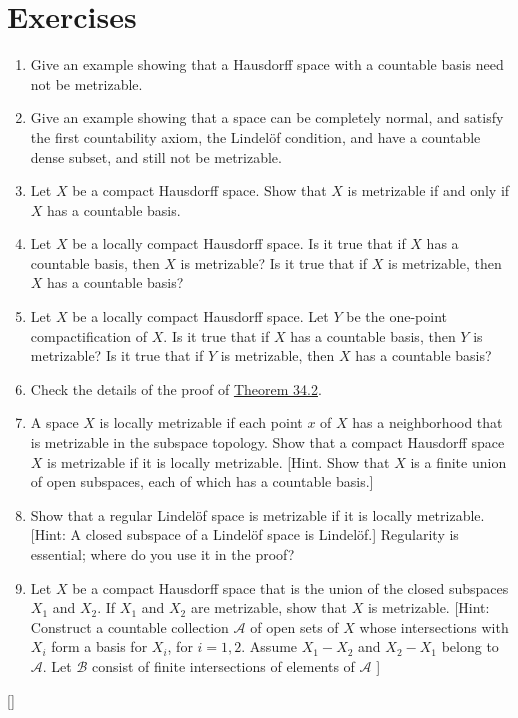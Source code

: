 \section*{Exercises}
\begin{enumerate}[itemsep=0.4em, parsep=0pt, topsep=0pt, partopsep=0pt, leftmargin=*, label=\arabic*., ref=\arabic*]
\item Give an example showing that a Hausdorff space with a countable basis need not be metrizable.
\item Give an example showing that a space can be completely normal, and satisfy the first countability axiom, the Lindelöf condition, and have a countable dense subset, and still not be metrizable.
\item Let \(X\) be a compact Hausdorff space. Show that \(X\) is metrizable if and only if \(X\) has a countable basis.
\item Let \(X\) be a locally compact Hausdorff space. Is it true that if \(X\) has a countable basis, then \(X\) is metrizable? Is it true that if \(X\) is metrizable, then \(X\) has a countable basis?
\item Let \(X\) be a locally compact Hausdorff space. Let \(Y\) be the one-point compactification of \(X\). Is it true that if \(X\) has a countable basis, then \(Y\) is metrizable? Is it true that if \(Y\) is metrizable, then \(X\) has a countable basis?
\item Check the details of the proof of \hyperref[thm:34.2]{Theorem 34.2}.
\item A space \(X\) is locally metrizable if each point \(x\) of \(X\) has a neighborhood that is metrizable in the subspace topology. Show that a compact Hausdorff space \(X\) is metrizable if it is locally metrizable. [Hint. Show that \(X\) is a finite union of open subspaces, each of which has a countable basis.]
\item Show that a regular Lindelöf space is metrizable if it is locally metrizable. [Hint: A closed subspace of a Lindelöf space is Lindelöf.] Regularity is essential; where do you use it in the proof?
\item Let \(X\) be a compact Hausdorff space that is the union of the closed subspaces \(X_{1}\) and \(X_{2}\). If \(X_{1}\) and \(X_{2}\) are metrizable, show that \(X\) is metrizable. [Hint: Construct a countable collection \(\mathcal{A}\) of open sets of \(X\) whose intersections with \(X_{i}\) form a basis for \(X_{i}\), for \(i = 1,2\). Assume \(X_{1} - X_{2}\) and \(X_{2} - X_{1}\) belong to \(\mathcal{A}\). Let \(\mathcal{B}\) consist of finite intersections of elements of \(\mathcal{A}\) ]
\end{enumerate}
[\protect\sectionDagger]

